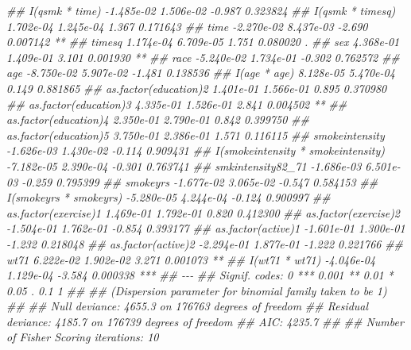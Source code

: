 \documentclass[
  10pt,
  a4paper,
]{book}
\newenvironment{Shaded}{\begin{snugshade}}{\end{snugshade}}
\newcommand{\DocumentationTok}[1]{\textcolor[rgb]{0.37,0.37,0.37}{\textit{#1}}}
\begin{document}
\begin{Shaded}
\begin{Highlighting}[]
\DocumentationTok{\#\# I(qsmk * time)                     {-}1.485e{-}02  1.506e{-}02  {-}0.987 0.323824    }
\DocumentationTok{\#\# I(qsmk * timesq)                    1.702e{-}04  1.245e{-}04   1.367 0.171643    }
\DocumentationTok{\#\# time                               {-}2.270e{-}02  8.437e{-}03  {-}2.690 0.007142 ** }
\DocumentationTok{\#\# timesq                              1.174e{-}04  6.709e{-}05   1.751 0.080020 .  }
\DocumentationTok{\#\# sex                                 4.368e{-}01  1.409e{-}01   3.101 0.001930 ** }
\DocumentationTok{\#\# race                               {-}5.240e{-}02  1.734e{-}01  {-}0.302 0.762572    }
\DocumentationTok{\#\# age                                {-}8.750e{-}02  5.907e{-}02  {-}1.481 0.138536    }
\DocumentationTok{\#\# I(age * age)                        8.128e{-}05  5.470e{-}04   0.149 0.881865    }
\DocumentationTok{\#\# as.factor(education)2               1.401e{-}01  1.566e{-}01   0.895 0.370980    }
\DocumentationTok{\#\# as.factor(education)3               4.335e{-}01  1.526e{-}01   2.841 0.004502 ** }
\DocumentationTok{\#\# as.factor(education)4               2.350e{-}01  2.790e{-}01   0.842 0.399750    }
\DocumentationTok{\#\# as.factor(education)5               3.750e{-}01  2.386e{-}01   1.571 0.116115    }
\DocumentationTok{\#\# smokeintensity                     {-}1.626e{-}03  1.430e{-}02  {-}0.114 0.909431    }
\DocumentationTok{\#\# I(smokeintensity * smokeintensity) {-}7.182e{-}05  2.390e{-}04  {-}0.301 0.763741    }
\DocumentationTok{\#\# smkintensity82\_71                  {-}1.686e{-}03  6.501e{-}03  {-}0.259 0.795399    }
\DocumentationTok{\#\# smokeyrs                           {-}1.677e{-}02  3.065e{-}02  {-}0.547 0.584153    }
\DocumentationTok{\#\# I(smokeyrs * smokeyrs)             {-}5.280e{-}05  4.244e{-}04  {-}0.124 0.900997    }
\DocumentationTok{\#\# as.factor(exercise)1                1.469e{-}01  1.792e{-}01   0.820 0.412300    }
\DocumentationTok{\#\# as.factor(exercise)2               {-}1.504e{-}01  1.762e{-}01  {-}0.854 0.393177    }
\DocumentationTok{\#\# as.factor(active)1                 {-}1.601e{-}01  1.300e{-}01  {-}1.232 0.218048    }
\DocumentationTok{\#\# as.factor(active)2                 {-}2.294e{-}01  1.877e{-}01  {-}1.222 0.221766    }
\DocumentationTok{\#\# wt71                                6.222e{-}02  1.902e{-}02   3.271 0.001073 ** }
\DocumentationTok{\#\# I(wt71 * wt71)                     {-}4.046e{-}04  1.129e{-}04  {-}3.584 0.000338 ***}
\DocumentationTok{\#\# {-}{-}{-}}
\DocumentationTok{\#\# Signif. codes:  0 \textquotesingle{}***\textquotesingle{} 0.001 \textquotesingle{}**\textquotesingle{} 0.01 \textquotesingle{}*\textquotesingle{} 0.05 \textquotesingle{}.\textquotesingle{} 0.1 \textquotesingle{} \textquotesingle{} 1}
\DocumentationTok{\#\# }
\DocumentationTok{\#\# (Dispersion parameter for binomial family taken to be 1)}
\DocumentationTok{\#\# }
\DocumentationTok{\#\#     Null deviance: 4655.3  on 176763  degrees of freedom}
\DocumentationTok{\#\# Residual deviance: 4185.7  on 176739  degrees of freedom}
\DocumentationTok{\#\# AIC: 4235.7}
\DocumentationTok{\#\# }
\DocumentationTok{\#\# Number of Fisher Scoring iterations: 10}


\end{Highlighting}
\end{Shaded}
\end{document}
